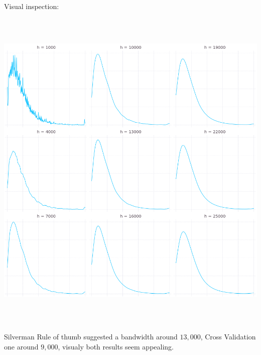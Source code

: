 \documentclass{article}
\begin{document}
Visual inspection:

\begin{center}
\includegraphics[width=16cm, height=16cm]{Q4-c.png}
\end{center}

Silverman Rule of thumb suggested a bandwidth around $13,000$, Cross Validation one
around $9,000$, visualy both results seem appealing.
\end{document}

